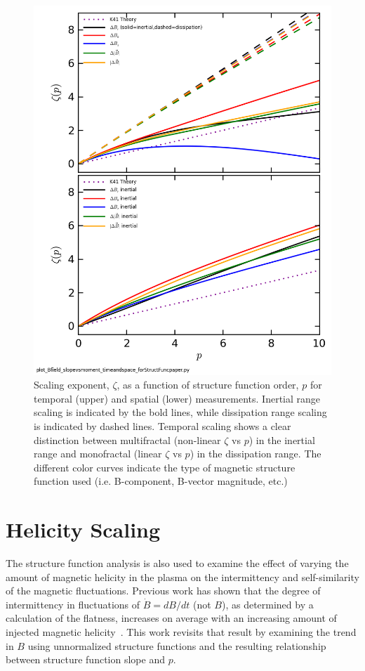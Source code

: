 \documentclass[preprint2]{aastex}
\begin{document}
\begin{figure}
\includegraphics[width={\columnwidth}]{Bfield_StructureFunctionSlope_vs_Moment_timeandspace_100313Shots41to80_forStructFuncpaper.png}
\caption{\label{fig:slopevsmom} Scaling exponent, $\zeta$, as a function of structure function order, $p$ for temporal (upper) and spatial (lower) measurements. Inertial range scaling is indicated by the bold lines, while dissipation range scaling is indicated by dashed lines. Temporal scaling shows a clear distinction between multifractal (non-linear $\zeta$ vs $p$) in the inertial range and monofractal (linear $\zeta$ vs $p$) in the dissipation range. The different color curves indicate the type of magnetic structure function used (i.e. B-component, B-vector magnitude, etc.) }
\end{figure}

\section{Helicity Scaling}

The structure function analysis is also used to examine the effect of varying the amount of magnetic helicity in the plasma on the intermittency and self-similarity of the magnetic fluctuations. Previous work has shown that the degree of intermittency in fluctuations of $\dot{B}=dB/dt$ (not $B$), as determined by a calculation of the flatness, increases on average with an increasing amount of injected magnetic helicity~\citep{schaffner2014b}. This work revisits that result by examining the trend in $B$ using unnormalized structure functions and the resulting relationship between structure function slope and $p$. 
\end{document}
